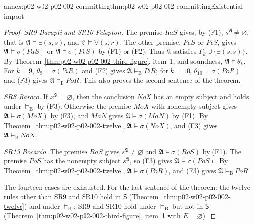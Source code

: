 \begin{annexitem}{annex:p02-w02-p02-002-committing}{thm:p02-w02-p02-002-committing}{Existential import}
\begin{proof}
\emph{SR9 Darapti and SR10 Felapton.} The premise \(RaS\) gives, by (F1),
\(s^{\mathfrak A}\ne\varnothing\), that is \(\mathfrak A\models\exists(s,s)\),
and \(\mathfrak A\models\forall(s,r)\). The other premise, \(PaS\) or
\(PeS\), gives \(\mathfrak A\models\sigma(PaS)\) or
\(\mathfrak A\models\sigma(PeS)\) by (F1) or (F2). Thus \(\mathfrak A\)
satisfies \(\Gamma_k\cup\{\exists(s,s)\}\). By
Theorem~\ref{thm:p02-w02-p02-002-third-figure}, item~1, and soundness,
\(\mathfrak A\models\theta_k\). For \(k=9\), \(\theta_9=\sigma(PiR)\) and
(F2) gives \(\mathfrak A\models_{\mathrm B}PiR\); for \(k=10\),
\(\theta_{10}=\sigma(PoR)\) and (F3) gives \(\mathfrak A\models_{\mathrm B}PoR\).
This also proves the second sentence of the theorem.

\emph{SR8 Baroco.} If \(x^{\mathfrak A}=\varnothing\), then the conclusion
\(NoX\) has an empty subject and holds under \(\models_{\mathrm B}\) by (F3).
Otherwise the premise \(MoX\) with nonempty subject gives
\(\mathfrak A\models\sigma(MoX)\) by (F3), and \(MaN\) gives
\(\mathfrak A\models\sigma(MaN)\) by (F1). By
Theorem~\ref{thm:p02-w02-p02-002-twelve},
\(\mathfrak A\models\sigma(NoX)\), and (F3) gives
\(\mathfrak A\models_{\mathrm B}NoX\).

\emph{SR13 Bocardo.} The premise \(RaS\) gives \(s^{\mathfrak A}\ne\varnothing\)
and \(\mathfrak A\models\sigma(RaS)\) by (F1). The premise \(PoS\) has the
nonempty subject \(s^{\mathfrak A}\), so (F3) gives
\(\mathfrak A\models\sigma(PoS)\). By
Theorem~\ref{thm:p02-w02-p02-002-twelve},
\(\mathfrak A\models\sigma(PoR)\), and (F3) gives
\(\mathfrak A\models_{\mathrm B}PoR\).

The fourteen cases are exhausted. For the last sentence of the theorem:
the twelve rules other than SR9 and SR10 hold in \(\mathsf S\)
(Theorem~\ref{thm:p02-w02-p02-002-twelve}) and under \(\models_{\mathrm B}\);
SR9 and SR10 hold under \(\models_{\mathrm B}\) but not in \(\mathsf S\)
(Theorem~\ref{thm:p02-w02-p02-002-third-figure}, item~1 with
\(E=\varnothing\)).
\end{proof}
\end{annexitem}

